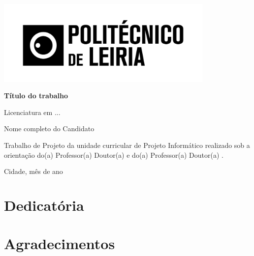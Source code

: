 \documentclass[a4paper,12pt,twoside]{report}
\begin{document}
	\begin{titlepage}
		\centering
		\includegraphics[width=0.8\textwidth]{imagens/logo.png} %
		\vspace*{1cm}
		
		\Huge
		\textbf{Título do trabalho}
		
		\vspace{1.5cm}
		
		\LARGE
		Licenciatura em ...
		
		\vfill
		
		\Large
		Nome completo do Candidato
		
		\vspace{0.8cm}
		
		\justifying
		\normalsize
		Trabalho de Projeto da unidade curricular de Projeto Informático realizado sob a orientação do(a) Professor(a) Doutor(a) \underline{\hspace{3cm}} e do(a) Professor(a) Doutor(a) \underline{\hspace{3cm}}.
		
		\centering
		\vspace{0.8cm}
		
		\normalsize
		Cidade, mês de ano
		
		\vspace{1.5cm}
	\end{titlepage}
	
	
	\pagestyle{plain} %
	
	\chapter*{Dedicatória}
	\lipsum[1]
	
	\chapter*{Agradecimentos}
	\lipsum[1]
	
\end{document}
